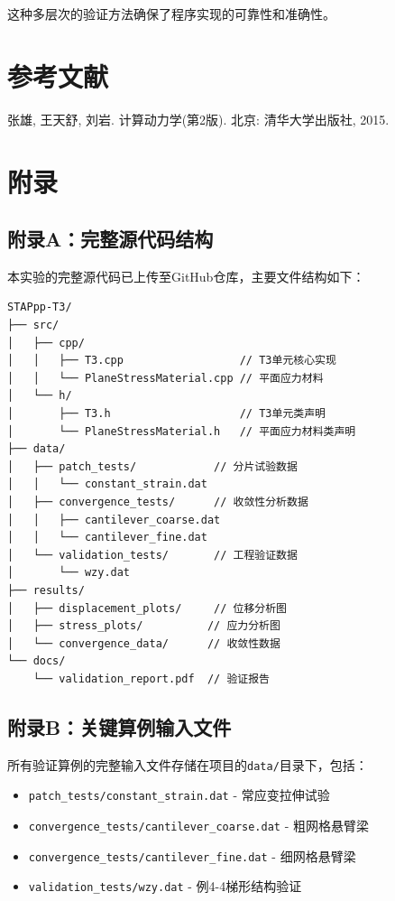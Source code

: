 \documentclass[12pt,a4paper]{article}
\begin{document}
这种多层次的验证方法确保了程序实现的可靠性和准确性。

\section{参考文献}

\begin{thebibliography}{99}
 张雄, 王天舒, 刘岩. 计算动力学(第2版). 北京: 清华大学出版社, 2015.
\end{thebibliography}

\section{附录}

\subsection{附录A：完整源代码结构}

本实验的完整源代码已上传至GitHub仓库，主要文件结构如下：

\begin{lstlisting}[caption=项目文件结构]
STAPpp-T3/
├── src/
│   ├── cpp/
│   │   ├── T3.cpp                  // T3单元核心实现
│   │   └── PlaneStressMaterial.cpp // 平面应力材料
│   └── h/
│       ├── T3.h                    // T3单元类声明
│       └── PlaneStressMaterial.h   // 平面应力材料类声明
├── data/
│   ├── patch_tests/            // 分片试验数据
│   │   └── constant_strain.dat
│   ├── convergence_tests/      // 收敛性分析数据
│   │   ├── cantilever_coarse.dat
│   │   └── cantilever_fine.dat
│   └── validation_tests/       // 工程验证数据
│       └── wzy.dat
├── results/
│   ├── displacement_plots/     // 位移分析图
│   ├── stress_plots/          // 应力分析图
│   └── convergence_data/      // 收敛性数据
└── docs/
    └── validation_report.pdf  // 验证报告
\end{lstlisting}

\subsection{附录B：关键算例输入文件}

所有验证算例的完整输入文件存储在项目的\texttt{data/}目录下，包括：
\begin{itemize}
    \item \texttt{patch\_tests/constant\_strain.dat} - 常应变拉伸试验
    \item \texttt{convergence\_tests/cantilever\_coarse.dat} - 粗网格悬臂梁
    \item \texttt{convergence\_tests/cantilever\_fine.dat} - 细网格悬臂梁
    \item \texttt{validation\_tests/wzy.dat} - 例4-4梯形结构验证
\end{itemize}
\end{document}
